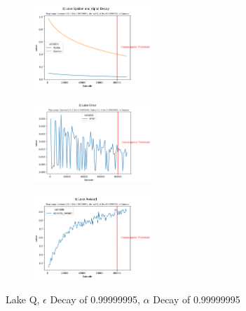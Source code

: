 \documentclass[letterpaper]{article} %
\begin{document}
\begin{figure}[!htb]
	\centering
 	\begin{subfigure}[b]{0.275\textwidth}
			\centering
		\includegraphics[width=1.75in]{Figures/Q_Lake_Epsilon_and_Alpha_Decay_Map_Large__Gamma_0_9__E_Dec_0_99999995__Alpha_0_1__A_Dec_0_99999995__Is_Slippery.png}
  	\end{subfigure}%
	 \begin{subfigure}[b]{0.275\textwidth}
	 		\centering
		\includegraphics[width=1.75in]{Figures/Q_Lake_Error_Map_Large__Gamma_0_9__E_Dec_0_99999995__Alpha_0_1__A_Dec_0_99999995__Is_Slippery.png}
  	\end{subfigure}
	\begin{subfigure}[b]{0.5\textwidth}
			\centering
		\includegraphics[width=1.75in]{Figures/Q_Lake_Reward_Map_Large__Gamma_0_9__E_Dec_0_99999995__Alpha_0_1__A_Dec_0_99999995__Is_Slippery.png}
  	\end{subfigure}
\caption{Lake Q,  $\epsilon$ Decay of 0.99999995, $\alpha$ Decay of 0.99999995}
\label{fig:lake_q_e_99999995_a_99999995_rewards}
\end{figure}
\end{document}
